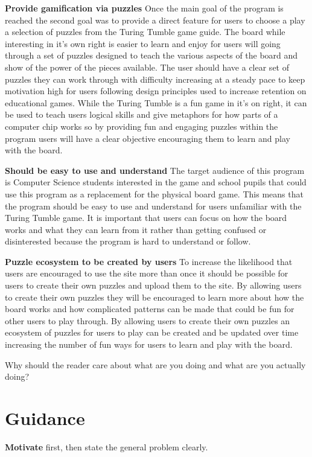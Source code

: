 \documentclass{l4proj}
\begin{document}
\textbf{Provide gamification via puzzles} Once the main goal of the program is reached the second goal was to provide a direct feature for users to choose a play a selection of puzzles from the Turing Tumble game guide. The board while interesting in it's own right is easier to learn and enjoy for users will going through a set of puzzles designed to teach the various aspects of the board and show of the power of the pieces available. The user should have a clear set of puzzles they can work through with difficulty increasing at a steady pace to keep motivation high for users following design principles used to increase retention on educational games. While the Turing Tumble is a fun game in it's on right, it can be used to teach users logical skills and give metaphors for how parts of a computer chip works so by providing fun and engaging puzzles within the program users will have a clear objective encouraging them to learn and play with the board.   

\textbf{Should be easy to use and understand} The target audience of this program is Computer Science students interested in the game and school pupils that could use this program as a replacement for the physical board game. This means that the program should be easy to use and understand for users unfamiliar with the Turing Tumble game. It is important that users can focus on how the board works and what they can learn from it rather than getting confused or disinterested because the program is hard to understand or follow. 

\textbf{Puzzle ecosystem to be created by users} To increase the likelihood that users are encouraged to use the site more than once it should be possible for users to create their own puzzles and upload them to the site. By allowing users to create their own puzzles they will be encouraged to learn more about how the board works and how complicated patterns can be made that could be fun for other users to play through. By allowing users to create their own puzzles an ecosystem of puzzles for users to play can be created and be updated over time increasing the number of fun ways for users to learn and play with the board. 


Why should the reader care about what are you doing and what are you actually doing?
\section{Guidance}

\textbf{Motivate} first, then state the general problem clearly. 
\end{document}

